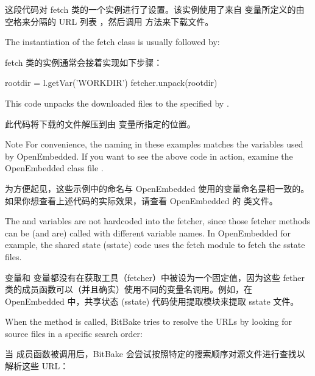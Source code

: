 这段代码对 fetch 类的一个实例进行了设置。该实例使用了来自  变量所定义的由空格来分隔的 URL 列表 ，然后调用  方法来下载文件。

The instantiation of the fetch class is usually followed by:

fetch 类的实例通常会接着实现如下步骤：

\begin{pyglist}
rootdir = l.getVar('WORKDIR')
fetcher.unpack(rootdir)
\end{pyglist}

This code unpacks the downloaded files to the specified by .

此代码将下载的文件解压到由  变量所指定的位置。

\medskip
\begin{noteblock}{Note}%
For convenience, the naming in these examples matches the variables used by OpenEmbedded. If you want to see the above code in action, examine the OpenEmbedded class file .

\medskip
为方便起见，这些示例中的命名与 OpenEmbedded 使用的变量命名是相一致的。如果你想查看上述代码的实际效果，请查看 OpenEmbedded 的  类文件。
\end{noteblock}

The  and  variables are not hardcoded into the fetcher, since those fetcher methods can be (and are) called with different variable names. In OpenEmbedded for example, the shared state (sstate) code uses the fetch module to fetch the sstate files.

 变量和  变量都没有在获取工具（fetcher）中被设为一个固定值，因为这些 fether 类的成员函数可以（并且确实）使用不同的变量名调用。例如，在 OpenEmbedded 中，共享状态 (sstate) 代码使用提取模块来提取 sstate 文件。

When the  method is called, BitBake tries to resolve the URLs by looking for source files in a specific search order:

当  成员函数被调用后，BitBake 会尝试按照特定的搜索顺序对源文件进行查找以解析这些 URL：


